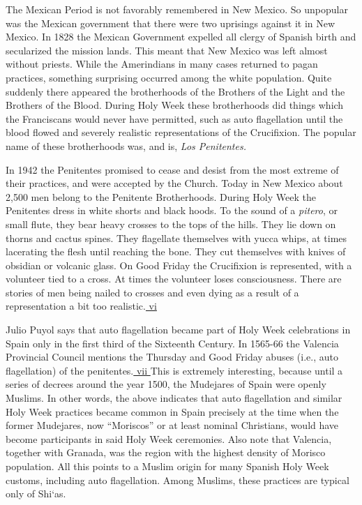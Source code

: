 The Mexican Period is not favorably remembered in New Mexico. So unpopular was the Mexican government that there were two uprisings against it in New Mexico. In 1828 the Mexican Government expelled all clergy of Spanish birth and secularized the mission lands. This meant that New Mexico was left almost without priests. While the Amerindians in many cases returned to pagan practices, something surprising occurred among the white population. Quite suddenly there appeared the brotherhoods of the Brothers of the Light and the Brothers of the Blood. During Holy Week these brotherhoods did things which the Franciscans would never have permitted, such as auto flagellation until the blood flowed and severely realistic representations of the Crucifixion. The popular name of these brotherhoods was, and is, \emph{Los Penitentes.}

In 1942 the Penitentes promised to cease and desist from the most extreme of their practices, and were accepted by the Church. Today in New Mexico about 2,500 men belong to the Penitente Brotherhoods. During Holy Week the Penitentes dress in white shorts and black hoods. To the sound of a \emph{pitero}, or small flute, they bear heavy crosses to the tops of the hills. They lie down on thorns and cactus spines. They flagellate themselves with yucca whips, at times lacerating the flesh until reaching the bone. They cut themselves with knives of obsidian or volcanic glass. On Good Friday the Crucifixion is represented, with a volunteer tied to a cross. At times the volunteer loses consciousness. There are stories of men being nailed to crosses and even dying as a result of a representation a bit too realistic.\hyperref[_edn6]{ vi }

Julio Puyol says that auto flagellation became part of Holy Week celebrations in Spain only in the first third of the Sixteenth Century. In 1565-66 the Valencia Provincial Council mentions the Thursday and Good Friday abuses (i.e., auto flagellation) of the penitentes.\hyperref[_edn7]{ vii } This is extremely interesting, because until a series of decrees around the year 1500, the Mudejares of Spain were openly Muslims. In other words, the above indicates that auto flagellation and similar Holy Week practices became common in Spain precisely at the time when the former Mudejares, now ``Moriscos'' or at least nominal Christians, would have become participants in said Holy Week ceremonies. Also note that Valencia, together with Granada, was the region with the highest density of Morisco population. All this points to a Muslim origin for many Spanish Holy Week customs, including auto flagellation. Among Muslims, these practices are typical only of Shi`as.

